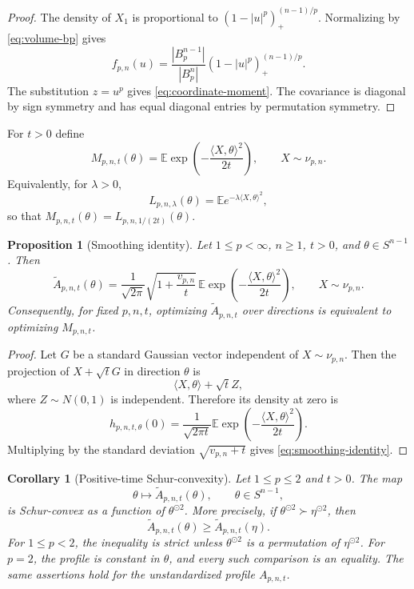 \documentclass[pdflatex,sn-mathphys-num]{sn-jnl}
\numberwithin{equation}{section}
\theoremstyle{thmstyleone}
\newtheorem{proposition}[theorem]{Proposition}
\newtheorem{corollary}[theorem]{Corollary}
\theoremstyle{thmstylethree}
\newcommand{\E}{\mathbb{E}}
\newcommand{\1}{\mathbf{1}}
\newcommand{\sphere}{S^{n-1}}
\newcommand{\sqvec}[1]{#1^{\odot 2}}
\begin{document}
\begin{proof}
The density of $X_1$ is proportional to $(1-|u|^p)_+^{(n-1)/p}$. Normalizing by \eqref{eq:volume-bp} gives
\[
 f_{p,n}(u)=\frac{|B_p^{n-1}|}{|B_p^n|}(1-|u|^p)_+^{(n-1)/p}.
\]
The substitution $z=u^p$ gives \eqref{eq:coordinate-moment}. The covariance is diagonal by sign symmetry and has equal diagonal entries by permutation symmetry.
\end{proof}


For $t>0$ define
\[
 M_{p,n,t}(\theta)=\E\exp\left(-\frac{\langle X,\theta\rangle^2}{2t}\right),
 \qquad X\sim\nu_{p,n}.
\]
Equivalently, for $\lambda>0$,
\[
 L_{p,n,\lambda}(\theta)=\E e^{-\lambda\langle X,\theta\rangle^2},
\]
so that $M_{p,n,t}(\theta)=L_{p,n,1/(2t)}(\theta)$.

\begin{proposition}[Smoothing identity]\label{prop:smoothing}
Let $1\le p<\infty$, $n\ge1$, $t>0$, and $\theta\in\sphere$. Then
\begin{equation}\label{eq:smoothing-identity}
 \widetilde A_{p,n,t}(\theta)
 =\frac1{\sqrt{2\pi}}\sqrt{1+\frac{v_{p,n}}{t}}\,
 \E\exp\left(-\frac{\langle X,\theta\rangle^2}{2t}\right),
 \qquad X\sim\nu_{p,n}.
\end{equation}
Consequently, for fixed $p,n,t$, optimizing $\widetilde A_{p,n,t}$ over directions is equivalent to optimizing $M_{p,n,t}$.
\end{proposition}

\begin{proof}
Let $G$ be a standard Gaussian vector independent of $X\sim\nu_{p,n}$. Then the projection of $X+\sqrt tG$ in direction $\theta$ is
\[
 \langle X,\theta\rangle+\sqrt t Z,
\]
where $Z\sim N(0,1)$ is independent. Therefore its density at zero is
\[
 h_{p,n,t,\theta}(0)
 =\frac1{\sqrt{2\pi t}}
 \E\exp\left(-\frac{\langle X,\theta\rangle^2}{2t}\right).
\]
Multiplying by the standard deviation $\sqrt{v_{p,n}+t}$ gives \eqref{eq:smoothing-identity}.
\end{proof}


\begin{corollary}[Positive-time Schur-convexity]\label{cor:positive-time-schur}
Let $1\le p\le2$ and $t>0$. The map
\[
 \theta\longmapsto\widetilde A_{p,n,t}(\theta),
 \qquad \theta\in\sphere,
\]
is Schur-convex as a function of $\sqvec\theta$. More precisely, if
$\sqvec\theta\succ\sqvec\eta$, then
\[
 \widetilde A_{p,n,t}(\theta)
 \ge
 \widetilde A_{p,n,t}(\eta).
\]
For $1\le p<2$, the inequality is strict unless
$\sqvec\theta$ is a permutation of $\sqvec\eta$. For $p=2$, the
profile is constant in $\theta$, and every such comparison is an
equality. The same assertions hold for the unstandardized profile
$A_{p,n,t}$.
\end{corollary}
\end{document}
